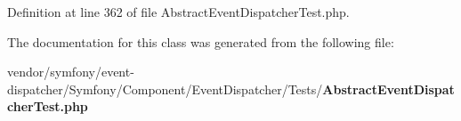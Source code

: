 Definition at line 362 of file Abstract\+Event\+Dispatcher\+Test.\+php.



The documentation for this class was generated from the following file\+:\begin{DoxyCompactItemize}
\item 
vendor/symfony/event-\/dispatcher/\+Symfony/\+Component/\+Event\+Dispatcher/\+Tests/{\bf Abstract\+Event\+Dispatcher\+Test.\+php}\end{DoxyCompactItemize}
